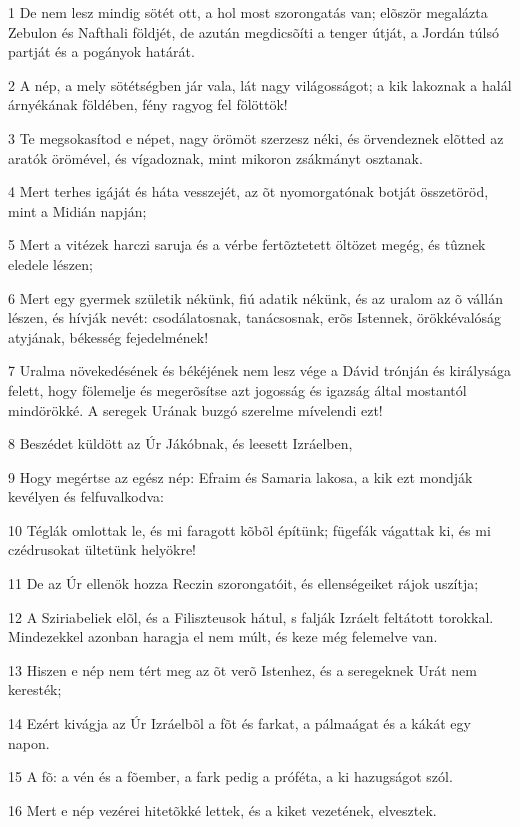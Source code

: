 \par 1 De nem lesz mindig sötét ott, a hol most szorongatás van; elõször megalázta Zebulon és Nafthali földjét, de azután megdicsõíti a tenger útját, a Jordán túlsó partját és a pogányok határát.
\par 2 A nép, a mely sötétségben jár vala, lát nagy világosságot; a kik lakoznak a halál árnyékának földében, fény ragyog fel fölöttök!
\par 3 Te megsokasítod e népet, nagy örömöt szerzesz néki, és örvendeznek elõtted az aratók örömével, és vígadoznak, mint mikoron zsákmányt osztanak.
\par 4 Mert terhes igáját és háta vesszejét, az õt nyomorgatónak botját összetöröd, mint a Midián napján;
\par 5 Mert a vitézek harczi saruja és a vérbe fertõztetett öltözet megég, és tûznek eledele lészen;
\par 6 Mert egy gyermek születik nékünk, fiú adatik nékünk, és az uralom az õ vállán lészen, és hívják nevét: csodálatosnak,  tanácsosnak, erõs Istennek, örökkévalóság atyjának, békesség fejedelmének!
\par 7 Uralma növekedésének és békéjének nem lesz vége a Dávid trónján és királysága felett, hogy fölemelje és megerõsítse azt jogosság és igazság által mostantól mindörökké. A  seregek Urának buzgó szerelme mívelendi ezt!
\par 8 Beszédet küldött az Úr Jákóbnak, és leesett Izráelben,
\par 9 Hogy megértse az egész nép: Efraim és Samaria lakosa, a kik ezt mondják kevélyen és felfuvalkodva:
\par 10 Téglák omlottak le, és mi faragott kõbõl építünk; fügefák vágattak ki, és mi czédrusokat ültetünk helyökre!
\par 11 De az Úr ellenök hozza Reczin szorongatóit, és ellenségeiket rájok uszítja;
\par 12 A Sziriabeliek elõl, és a Filiszteusok hátul, s falják Izráelt feltátott torokkal. Mindezekkel azonban haragja el nem múlt, és keze még felemelve van.
\par 13 Hiszen e nép nem tért meg az õt verõ Istenhez, és a seregeknek Urát nem keresték;
\par 14 Ezért kivágja az Úr Izráelbõl a fõt és farkat, a pálmaágat és a kákát egy napon.
\par 15 A fõ: a vén és a fõember, a fark pedig a próféta, a ki hazugságot szól.
\par 16 Mert e nép vezérei hitetõkké lettek, és a kiket vezetének, elvesztek.
